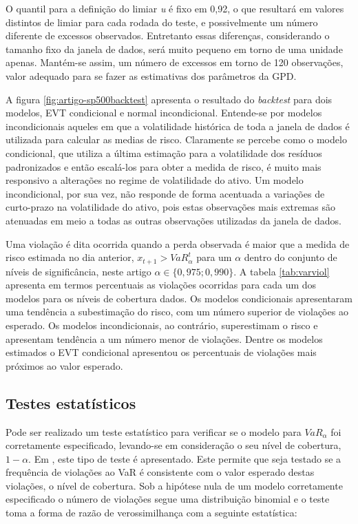 \documentclass[1p]{elsarticle}
\theoremstyle{definition}
\begin{document}
O quantil para a definição do limiar \emph{u} é fixo em 0,92, o que resultará em valores distintos de limiar para cada rodada do teste, e possivelmente um número diferente de excessos observados. Entretanto essas diferenças, considerando o tamanho fixo da janela de dados, será muito pequeno em torno de uma unidade apenas. Mantém-se assim, um número de excessos em torno de 120 observações, valor adequado para se fazer as estimativas dos parâmetros da GPD.

A figura \ref{fig:artigo-sp500backtest} apresenta o resultado do \emph{backtest} para dois modelos, EVT condicional e normal incondicional. Entende-se por modelos incondicionais aqueles em que a volatilidade histórica de toda a janela de dados é utilizada para calcular as medias de risco. Claramente se percebe como o modelo condicional, que utiliza a última estimação para a volatilidade dos resíduos padronizados e então escalá-los para obter a medida de risco, é muito mais responsivo a alterações no regime de volatilidade do ativo. Um modelo incondicional, por sua vez, não responde de forma acentuada a variações de curto-prazo na volatilidade do ativo, pois estas observações mais extremas são atenuadas em meio a todas as outras observações utilizadas da janela de dados.

Uma violação é dita ocorrida quando a perda observada é maior que a medida de risco estimada no dia anterior, $x_{t+1}>VaR^t_\alpha$ para um $\alpha$ dentro do conjunto de níveis de significância, neste artigo $\alpha \in \{0,975; 0,990\}$. A tabela \ref{tab:varviol} apresenta em termos percentuais as violações ocorridas para cada um dos modelos para os níveis de cobertura dados. Os modelos condicionais apresentaram uma tendência a subestimação do risco, com um número superior de violações ao esperado. Os modelos incondicionais, ao contrário, superestimam o risco e apresentam tendência a um número menor de violações. Dentre os modelos estimados o EVT condicional apresentou os percentuais de violações mais próximos ao valor esperado.



\subsection{Testes estatísticos}
\label{sec:testes}

Pode ser realizado um teste estatístico para verificar se o modelo para $VaR_\alpha$ foi corretamente especificado, levando-se em consideração o seu nível de cobertura, $1-\alpha$. Em \cite{Kupiec1995}, este tipo de teste é apresentado. Este permite que seja testado se a frequência de violações ao VaR é consistente com o valor esperado destas violações, o nível de cobertura. Sob a hipótese nula de um modelo corretamente especificado o número de violações segue uma distribuição binomial e o teste toma a forma de razão de verossimilhança com a seguinte estatística:
\end{document}
